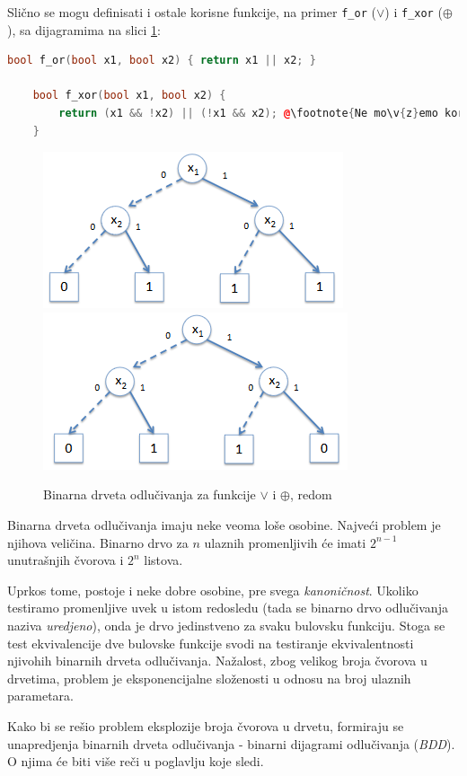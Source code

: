 \noindent Sli\v{c}no se mogu definisati i ostale korisne funkcije, na primer \texttt{f\_or} ($\vee$) i \texttt{f\_xor} ($\oplus$), sa dijagramima na slici \ref{fig:BDOrXor}:

\begin{lstlisting}[language=C++,escapechar=@]
    bool f_or(bool x1, bool x2) { return x1 || x2; }

    bool f_xor(bool x1, bool x2) {
        return (x1 && !x2) || (!x1 && x2); @\footnote{Ne mo\v{z}emo koristiti operator \^{} jer on operi\v{s}e nad promenljivima tipa \emph{int}, a ne \emph{bool}.}@
    }
\end{lstlisting}

\begin{figure}[H]
    \includegraphics[scale=0.68]{slike/BD_Or.PNG}
    \includegraphics[scale=0.68]{slike/BD_Xor.PNG}
    \caption{Binarna drveta odlu\v{c}ivanja za funkcije $\vee$ i $\oplus$, redom}
    \label{fig:BDOrXor}
\end{figure}

Binarna drveta odlu\v{c}ivanja imaju neke veoma lo\v{s}e osobine. Najve\'c{}i problem je njihova veli\v{c}ina. Binarno drvo za $n$ ulaznih promenljivih \'c{}e imati $2^{n-1}$ unutra\v{s}njih \v{c}vorova i $2^{n}$ listova.

Uprkos tome, postoje i neke dobre osobine, pre svega \emph{kanoni\v{c}nost}. Ukoliko testiramo promenljive uvek u istom redosledu (tada se binarno drvo odlu\v{c}ivanja naziva \emph{uredjeno}), onda je drvo jedinstveno za svaku bulovsku funkciju. Stoga se test ekvivalencije dve bulovske funkcije svodi na testiranje ekvivalentnosti njivohih binarnih drveta odlu\v{c}ivanja. Na\v{z}alost, zbog velikog broja \v{c}vorova u drvetima, problem je eksponencijalne slo\v{z}enosti u odnosu na broj ulaznih parametara.

Kako bi se re\v{s}io problem eksplozije broja \v{c}vorova u drvetu, formiraju se unapredjenja binarnih drveta odlu\v{c}ivanja - binarni dijagrami odlu\v{c}ivanja (\emph{BDD}). O njima \'c{}e biti vi\v{s}e re\v{c}i u poglavlju koje sledi.
